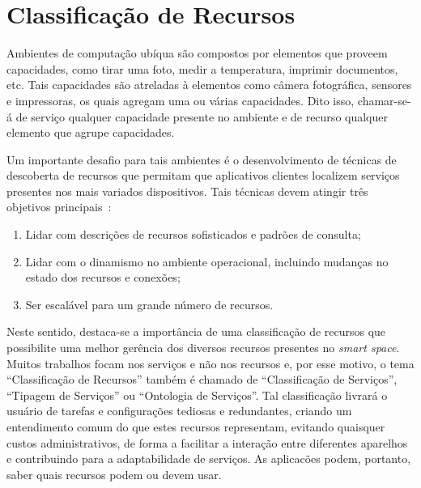 \chapter{Classificação de Recursos}

Ambientes de computação ubíqua são compostos por elementos que proveem capacidades, como tirar uma foto, medir a temperatura, imprimir documentos, etc. Tais capacidades são atreladas à elementos como câmera fotográfica, sensores e impressoras, os quais agregam uma ou várias capacidades. Dito isso, chamar-se-á de serviço qualquer capacidade presente no ambiente e de recurso qualquer elemento que agrupe capacidades.

Um importante desafio para tais ambientes é o desenvolvimento de técnicas de descoberta de recursos que permitam que aplicativos clientes localizem serviços presentes nos mais variados dispositivos. Tais técnicas devem atingir três objetivos principais~\cite{balazinska2002ins/twine}:

\begin{enumerate}
	\item Lidar com descrições de recursos sofisticados e padrões de consulta;
	\item Lidar com o dinamismo no ambiente operacional, incluindo mudanças no estado dos recursos e conexões;
	\item Ser escalável para um grande número de recursos.
\end{enumerate}

Neste sentido, destaca-se a importância de uma classificação de recursos que possibilite uma melhor gerência dos diversos recursos presentes no \emph{smart space}. Muitos trabalhos focam nos serviços e não nos recursos e, por esse motivo, o tema ``Classificação de Recursos'' também é chamado de ``Classificação de Serviços'', ``Tipagem de Serviços'' ou ``Ontologia de Serviços''. Tal classificação livrará o usuário de tarefas e configurações tediosas e redundantes, criando um entendimento comum do que estes recursos representam, evitando quaisquer custos administrativos, de forma a facilitar a interação entre diferentes aparelhos e contribuindo para a adaptabilidade de serviços. As aplicacões podem, portanto, saber quais recursos podem ou devem usar.

